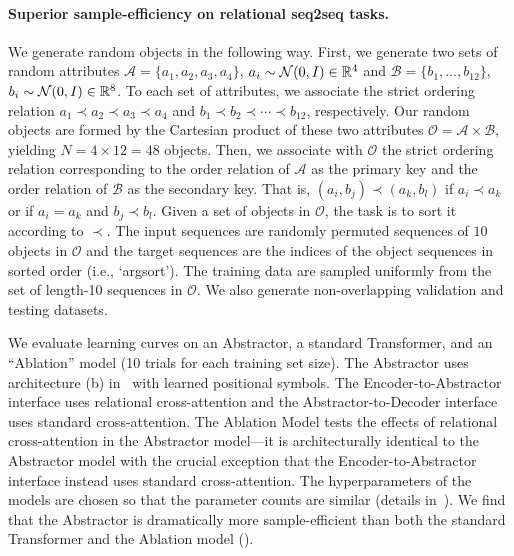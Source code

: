 \paragraph{Superior sample-efficiency on relational seq2seq tasks.}
We generate random objects in the following way. First, we generate two sets of random attributes $\mathcal{A} = \{a_1, a_2, a_3, a_4\}$, $a_i \sim {\mathcal{N}}(0, I) \in \mathbb{R}^{4}$ and $\mathcal{B} = \{b_1, \ldots, b_{12}\}$, $b_i \sim {\mathcal{N}}(0, I) \in \mathbb{R}^{8}$. To each set of attributes, we associate the strict ordering relation $a_1 \prec a_2 \prec a_3 \prec a_4$ and $b_1 \prec b_2 \prec \cdots \prec b_{12}$, respectively. Our random objects are formed by the Cartesian product of these two attributes $\mathcal{O} = \mathcal{A} \times \mathcal{B}$, yielding $N = 4 \times 12 = 48$ objects.
Then, we associate with $\mathcal{O}$ the strict ordering relation corresponding to the order relation of $\mathcal{A}$ as the primary key and the order relation of $\mathcal{B}$ as the secondary key. That is, $(a_i, b_j) \prec (a_k, b_l)$ if $a_i \prec a_k$ or if $a_i = a_k$ and $b_j \prec b_l$. Given a set of objects in $\mathcal{O}$, the task is to sort it according to $\prec$. The input sequences are randomly permuted sequences of $10$ objects in $\mathcal{O}$ and the target sequences are the indices of the object sequences in sorted order (i.e., `argsort'). The training data are sampled uniformly from the set of length-10 sequences in $\mathcal{O}$. We also generate non-overlapping validation and testing datasets.

We evaluate learning curves on an Abstractor, a standard Transformer, and an ``Ablation'' model (10 trials for each training set size). The Abstractor uses architecture (b) in~ with learned positional symbols. The Encoder-to-Abstractor interface uses relational cross-attention and the Abstractor-to-Decoder interface uses standard cross-attention. The Ablation Model tests the effects of relational cross-attention in the Abstractor model---it is architecturally identical to the Abstractor model with the crucial exception that the Encoder-to-Abstractor interface instead uses standard cross-attention. The hyperparameters of the models are chosen so that the parameter counts are similar (details in~). We find that the Abstractor is dramatically more sample-efficient than both the standard Transformer and the Ablation model ().

